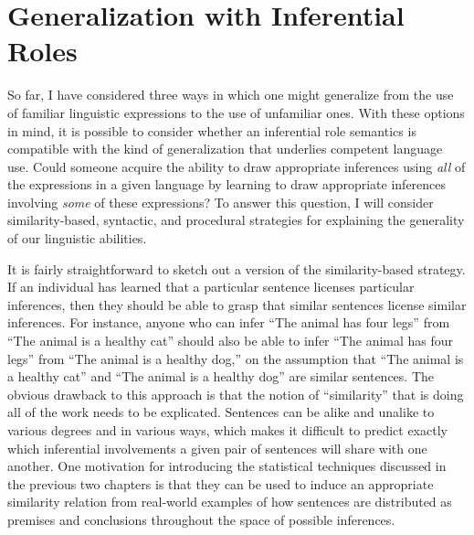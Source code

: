\section{Generalization with Inferential Roles}

So far, I have considered three ways in which one might generalize from the use of familiar linguistic expressions to the use of unfamiliar ones. With these options in mind, it is possible to consider whether an inferential role semantics is compatible with the kind of generalization that underlies competent language use. Could someone acquire the ability to draw appropriate inferences using \textit{all} of the expressions in a given language by learning to draw appropriate inferences involving \textit{some} of these expressions? To answer this question, I will consider similarity-based, syntactic, and procedural strategies for explaining the generality of our linguistic abilities.

It is fairly straightforward to sketch out a version of the similarity-based strategy. If an individual has learned that a particular sentence licenses particular inferences, then they should be able to grasp that similar sentences license similar inferences. For instance, anyone who can infer ``The animal has four legs'' from ``The animal is a healthy cat'' should also be able to infer ``The animal has four legs'' from ``The animal is a healthy dog,'' on the assumption that ``The animal is a healthy cat'' and ``The animal is a healthy dog'' are similar sentences. The obvious drawback to this approach is that the notion of ``similarity'' that is doing all of the work needs to be explicated. Sentences can be alike and unalike to various degrees and in various ways, which makes it difficult to predict exactly which inferential involvements a given pair of sentences will share with one another. One motivation for introducing the statistical techniques discussed in the previous two chapters is that they can be used to induce an appropriate similarity relation from real-world examples of how sentences are distributed as premises and conclusions throughout the space of possible inferences.

